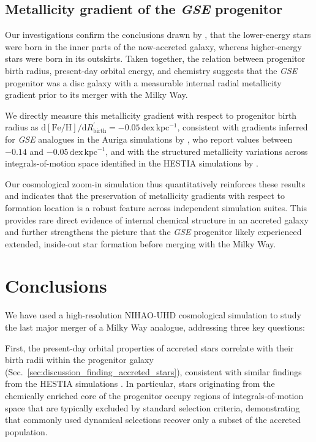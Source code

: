 \documentclass[fleqn,usenatbib]{mnras}
\newcommand{\changed}[1]{{{#1}}}
\newcommand{\changes}[1]{#1}
\begin{document}
\subsection{\changed{Metallicity gradient of the \textit{GSE} progenitor}}
\label{sec:discussion_gradient}

Our investigations confirm the conclusions drawn by \citet{Skuladottir2025}, that the lower-energy stars were born in the inner parts of the now-accreted galaxy, whereas higher-energy stars were born in its outskirts. Taken together, \changes{the relation between progenitor birth radius, present-day orbital energy, and chemistry suggests that the \textit{GSE} progenitor was a disc galaxy with a measurable internal radial metallicity gradient prior to its merger with the Milky Way.}

\changes{We directly measure this metallicity gradient with respect to progenitor birth radius as $\mathrm{d[Fe/H]}/\mathrm{d}R_\mathrm{birth}^\prime = -0.05\,\mathrm{dex\,kpc^{-1}}$,} consistent with gradients inferred for \textit{GSE} analogues in the Auriga simulations by \citet{Carrillo2026}, who report values between $-0.14$ and $-0.05\,\mathrm{dex\,kpc^{-1}}$, and with the structured metallicity variations across integrals-of-motion space identified in the HESTIA simulations by \citet{Khoperskov2023c}.

Our \changes{cosmological} zoom-in simulation thus quantitatively reinforces these results and indicates that the preservation of metallicity gradients with respect to formation location is a robust feature across independent simulation suites. This provides rare direct evidence of internal chemical structure in an accreted galaxy and further strengthens the picture that the \textit{GSE} progenitor likely experienced extended, inside-out star formation before merging with the Milky Way.

\section{Conclusions}
\label{sec:conclusions}

We have used a high-resolution NIHAO-UHD cosmological simulation to study the last major merger of a Milky Way analogue, addressing three key questions:

First, the present-day orbital properties of accreted stars correlate with their birth radii within the progenitor galaxy (Sec.~\ref{sec:discussion_finding_accreted_stars}), \changed{consistent with similar findings from the HESTIA simulations \citep{Khoperskov2023b}. In particular, stars originating from the chemically enriched core of the progenitor occupy regions of integrals-of-motion space that are typically excluded by standard selection criteria, demonstrating that commonly used dynamical selections recover only a subset of the accreted population.}
\end{document}
